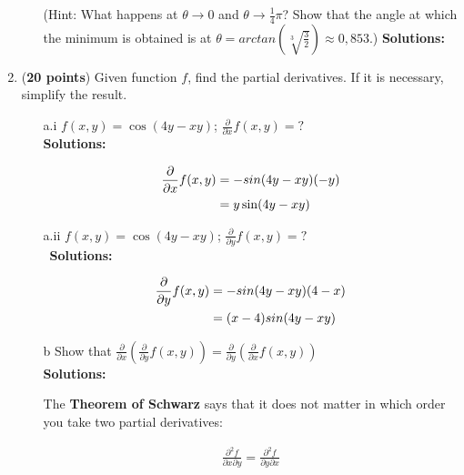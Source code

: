 \documentclass[a4paper]{article}
\begin{document}
\begin{enumerate}
\begin{enumerate}
	
	(Hint: What happens at $\theta \rightarrow 0$ and $\theta \rightarrow \frac{1}{4} \pi$? Show that the angle at which the minimum is obtained is at $\theta = arctan(\sqrt[3]{\frac{3}{2}}) \approx 0,853$.)
	\textbf{Solutions:}\\	
	
		
\end{enumerate}





\item (\textbf{20 points}) Given function $f$, find the partial derivatives. If it is necessary, simplify the result.

\begin{enumerate}
	\item[a.i] $f(x,y) = \cos(4y - xy)$; $\frac{\partial}{\partial x}f(x,y) = ?$\\
	\textbf{Solutions:}
	
	\begin{align}
		\frac{\partial}{\partial x}f(x,y) &= -sin(4y - xy)(-y)\notag\\
		&= y \sin(4y-xy) \notag
	\end{align}
	

	\item[a.ii] $f(x,y) = \cos(4y - xy)$; $\frac{\partial}{\partial y}f(x,y) = ?$\\\
	\textbf{Solutions:}
	
		\begin{align}
		\frac{\partial}{\partial y}f(x,y) &= -sin(4y-xy)(4-x)\notag\\
		&= (x-4)sin(4y - xy)\notag
	\end{align}
	\vspace{1em}
		
		
	\item[b] Show that $\frac{\partial}{\partial x}(\frac{\partial}{\partial y}f(x,y)) = \frac{\partial}{\partial y}(\frac{\partial}{\partial x}f(x,y))$\\
	\textbf{Solutions:}		
		
The \textbf{Theorem of Schwarz} says that it does not matter in which order you take two partial derivatives:

\begin{align*}
	\frac{\partial^2 f}{\partial x \partial y} = \frac{\partial^2 f}{\partial y \partial x}
\end{align*}	
	

\end{enumerate}
\end{enumerate}
\end{document}
